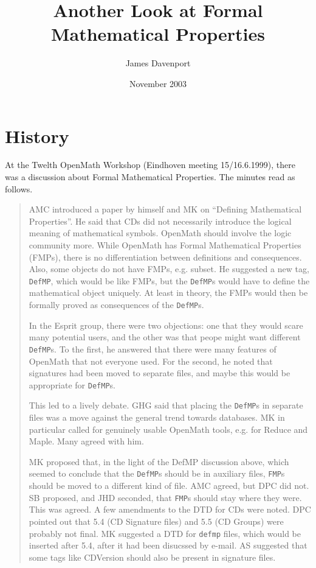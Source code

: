 \documentclass[11pt]{openmathTN}
\date{November 2003}
\title{Another Look at Formal Mathematical Properties}
\author{James Davenport}
\begin{document}
\maketitle
\tableofcontents
\newpage
\section{History}
At the Twelth OpenMath Workshop (Eindhoven meeting 15/16.6.1999), there was
a discussion about Formal Mathematical Properties. The minutes read as
follows.
\begin{quotation}
AMC introduced a paper by himself and MK on ``Defining Mathematical
Properties''. He said that CDs did not necessarily introduce the logical
meaning of mathematical symbols. OpenMath should involve the logic
community more. While OpenMath has Formal Mathematical Properties (FMPs),
there is no differentiation between definitions and consequences. Also, some
objects do not have FMPs, e.g. subset. He suggested a new tag,
\verb+DefMP+, which would be like FMPs, but the \verb+DefMP+s would have to
define the mathematical object uniquely.
At least in theory, the FMPs would then be formally proved as consequences
of the \verb+DefMP+s.
\par In the Esprit group, there were two objections: one that they would
scare many potential users, and the other was that peope might want
different \verb+DefMP+s. To the first, he answered that there were many
features of OpenMath that not everyone used. For the second, he noted that
signatures had been moved to separate files, and maybe this would be
appropriate for \verb+DefMP+s.
\par
This led to a lively debate. GHG said that placing the \verb+DefMP+s in
separate files was a move against the general trend towards databases.
MK in particular called for genuinely usable
OpenMath tools, e.g. for Reduce and Maple. Many agreed with him.
\par [Irrelevancies deleted.]
MK proposed that, in the light of the DefMP discussion above, which seemed
to conclude that the \verb+DefMP+s should be in auxiliary files,
\verb+FMP+s should be moved to a different kind of file. AMC agreed, but
DPC did not. SB proposed, and JHD seconded, that \verb+FMP+s should stay
where they were. This was agreed. A few amendments to the DTD for CDs were
noted. DPC pointed out that 5.4 (CD Signature files) and 5.5 (CD Groups)
were probably not final. MK suggested a DTD for \verb+defmp+ files, which
would be inserted after 5.4, after it had been disucssed by e-mail. 
AS suggested that some tags like CDVersion should also be present in
signature files.
\end{quotation}
\end{document}
